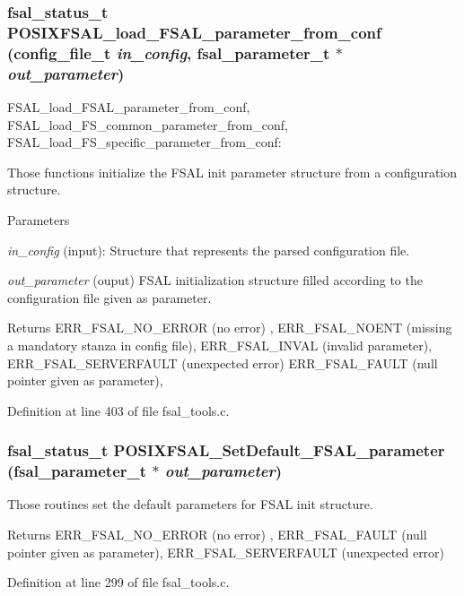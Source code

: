 \subsubsection[{POSIXFSAL\_\-load\_\-FSAL\_\-parameter\_\-from\_\-conf}]{\setlength{\rightskip}{0pt plus 5cm}fsal\_\-status\_\-t POSIXFSAL\_\-load\_\-FSAL\_\-parameter\_\-from\_\-conf (config\_\-file\_\-t {\em in\_\-config}, \/  fsal\_\-parameter\_\-t $\ast$ {\em out\_\-parameter})}\label{fsal__tools_8c_a2bc09c4ddffe8e6add848bccb0d57d0e}
FSAL\_\-load\_\-FSAL\_\-parameter\_\-from\_\-conf, FSAL\_\-load\_\-FS\_\-common\_\-parameter\_\-from\_\-conf, FSAL\_\-load\_\-FS\_\-specific\_\-parameter\_\-from\_\-conf:

Those functions initialize the FSAL init parameter structure from a configuration structure.


\begin{DoxyParams}{Parameters}
\item[{\em in\_\-config}](input): Structure that represents the parsed configuration file. \item[{\em out\_\-parameter}](ouput) FSAL initialization structure filled according to the configuration file given as parameter.\end{DoxyParams}
\begin{DoxyReturn}{Returns}
ERR\_\-FSAL\_\-NO\_\-ERROR (no error) , ERR\_\-FSAL\_\-NOENT (missing a mandatory stanza in config file), ERR\_\-FSAL\_\-INVAL (invalid parameter), ERR\_\-FSAL\_\-SERVERFAULT (unexpected error) ERR\_\-FSAL\_\-FAULT (null pointer given as parameter), 
\end{DoxyReturn}


Definition at line 403 of file fsal\_\-tools.c.
\subsubsection[{POSIXFSAL\_\-SetDefault\_\-FSAL\_\-parameter}]{\setlength{\rightskip}{0pt plus 5cm}fsal\_\-status\_\-t POSIXFSAL\_\-SetDefault\_\-FSAL\_\-parameter (fsal\_\-parameter\_\-t $\ast$ {\em out\_\-parameter})}\label{fsal__tools_8c_a1440e292731f296ff0fb04f16d6a3501}
Those routines set the default parameters for FSAL init structure. \begin{DoxyReturn}{Returns}
ERR\_\-FSAL\_\-NO\_\-ERROR (no error) , ERR\_\-FSAL\_\-FAULT (null pointer given as parameter), ERR\_\-FSAL\_\-SERVERFAULT (unexpected error) 
\end{DoxyReturn}


Definition at line 299 of file fsal\_\-tools.c.